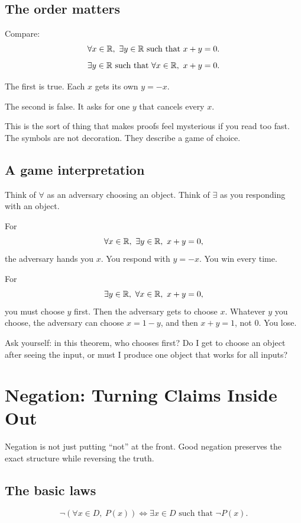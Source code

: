 \documentclass[11pt]{article}
\begin{document}
\subsection{The order matters}

Compare:
\[
\forall x\in\mathbb{R},\ \exists y\in\mathbb{R} \text{ such that } x+y=0.
\]
\[
\exists y\in\mathbb{R} \text{ such that } \forall x\in\mathbb{R},\ x+y=0.
\]

The first is true. Each $x$ gets its own $y=-x$.

The second is false. It asks for one $y$ that cancels every $x$.

This is the sort of thing that makes proofs feel mysterious if you read too fast. The symbols are not decoration. They describe a game of choice.

\subsection{A game interpretation}

Think of $\forall$ as an adversary choosing an object. Think of $\exists$ as you responding with an object.

For
\[
\forall x\in\R,\ \exists y\in\R,\ x+y=0,
\]
the adversary hands you $x$. You respond with $y=-x$. You win every time.

For
\[
\exists y\in\R,\ \forall x\in\R,\ x+y=0,
\]
you must choose $y$ first. Then the adversary gets to choose $x$. Whatever $y$ you choose, the adversary can choose $x=1-y$, and then $x+y=1$, not $0$. You lose.

\begin{walkbox}
Ask yourself: in this theorem, who chooses first? Do I get to choose an object after seeing the input, or must I produce one object that works for all inputs?
\end{walkbox}

\newpage
\section{Negation: Turning Claims Inside Out}

Negation is not just putting ``not'' at the front. Good negation preserves the exact structure while reversing the truth.

\subsection{The basic laws}

\[
\neg(\forall x\in D,\ P(x)) \Longleftrightarrow \exists x\in D \text{ such that } \neg P(x).
\]
\end{document}

